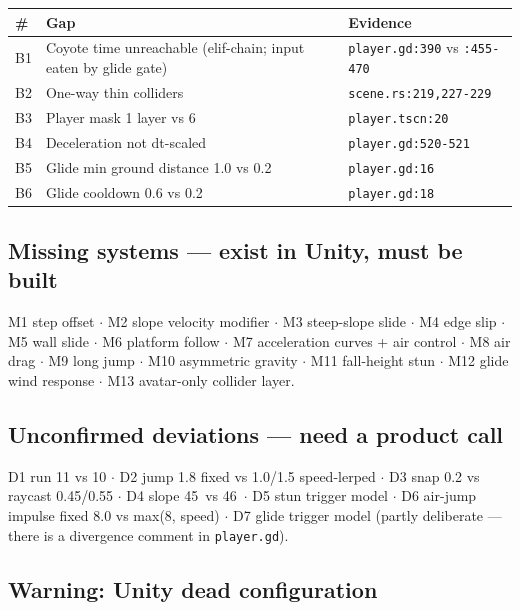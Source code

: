 \documentclass[11pt]{article}
\newcommand{\code}[1]{\texttt{\small #1}}
\begin{document}
\begin{center}\footnotesize
\begin{tabular}{@{}l L{8.2cm} L{4.6cm}@{}}
\toprule
\# & Gap & Evidence \\
\midrule
B1 & Coyote time unreachable (elif-chain; input eaten by glide gate) & \code{player.gd:390} vs \code{:455-470} \\
B2 & One-way thin colliders & \code{scene.rs:219,227-229} \\
B3 & Player mask 1 layer vs 6 & \code{player.tscn:20} \\
B4 & Deceleration not dt-scaled & \code{player.gd:520-521} \\
B5 & Glide min ground distance 1.0 vs 0.2 & \code{player.gd:16} \\
B6 & Glide cooldown 0.6 vs 0.2 & \code{player.gd:18} \\
\bottomrule
\end{tabular}
\end{center}

\subsection{Missing systems --- exist in Unity, must be built}

M1 step offset $\cdot$ M2 slope velocity modifier $\cdot$ M3 steep-slope slide $\cdot$
M4 edge slip $\cdot$ M5 wall slide $\cdot$ M6 platform follow $\cdot$ M7 acceleration
curves + air control $\cdot$ M8 air drag $\cdot$ M9 long jump $\cdot$ M10 asymmetric
gravity $\cdot$ M11 fall-height stun $\cdot$ M12 glide wind response $\cdot$ M13
avatar-only collider layer.

\subsection{Unconfirmed deviations --- need a product call}

D1 run 11 vs 10 $\cdot$ D2 jump 1.8 fixed vs 1.0/1.5 speed-lerped $\cdot$ D3 snap 0.2 vs
raycast 0.45/0.55 $\cdot$ D4 slope 45\textdegree\ vs 46\textdegree\ $\cdot$ D5 stun
trigger model $\cdot$ D6 air-jump impulse fixed 8.0 vs max(8, speed) $\cdot$ D7 glide
trigger model (partly deliberate --- there is a divergence comment in \code{player.gd}).

\subsection{Warning: Unity dead configuration}
\end{document}

